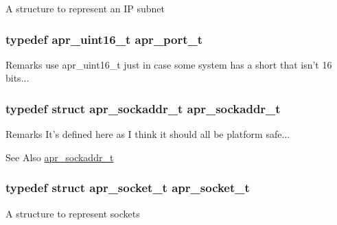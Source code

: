 A structure to represent an I\-P subnet \hypertarget{group__apr__network__io_gaa670a71960f6eb4fe0d0de2a1e7aba03}{
\subsubsection[{apr\-\_\-port\-\_\-t}]{\setlength{\rightskip}{0pt plus 5cm}typedef apr\-\_\-uint16\-\_\-t {\bf apr\-\_\-port\-\_\-t}}}\label{group__apr__network__io_gaa670a71960f6eb4fe0d0de2a1e7aba03}
\begin{DoxyRemark}{Remarks}
use apr\-\_\-uint16\-\_\-t just in case some system has a short that isn't 16 bits... 
\end{DoxyRemark}
\hypertarget{group__apr__network__io_ga373fb6f32d0875c5deb648b779c8a709}{
\subsubsection[{apr\-\_\-sockaddr\-\_\-t}]{\setlength{\rightskip}{0pt plus 5cm}typedef struct {\bf apr\-\_\-sockaddr\-\_\-t} {\bf apr\-\_\-sockaddr\-\_\-t}}}\label{group__apr__network__io_ga373fb6f32d0875c5deb648b779c8a709}
\begin{DoxyRemark}{Remarks}
It's defined here as I think it should all be platform safe... 
\end{DoxyRemark}
\begin{DoxySeeAlso}{See Also}
\hyperlink{structapr__sockaddr__t}{apr\-\_\-sockaddr\-\_\-t} 
\end{DoxySeeAlso}
\hypertarget{group__apr__network__io_ga49262b223e7434746e1f1737659aa2c3}{
\subsubsection[{apr\-\_\-socket\-\_\-t}]{\setlength{\rightskip}{0pt plus 5cm}typedef struct {\bf apr\-\_\-socket\-\_\-t} {\bf apr\-\_\-socket\-\_\-t}}}\label{group__apr__network__io_ga49262b223e7434746e1f1737659aa2c3}
A structure to represent sockets 

